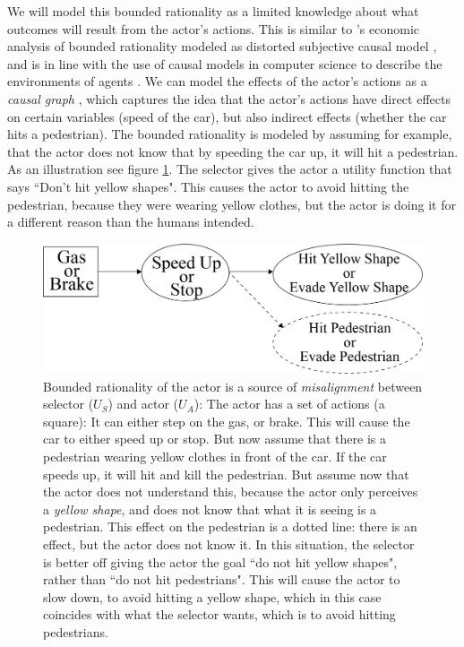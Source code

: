 We will model this bounded rationality as a limited knowledge about what outcomes will result from the actor's actions. This is similar to \citeauthor{Spiegler2016}'s economic analysis of bounded rationality modeled as distorted subjective causal model \citeyearpar{Spiegler2016,Spiegler2019}, and is in line with the use of causal models in computer science to describe the environments of agents \citep{Everitt2019}. We can model the effects of the actor's actions as a \textit{causal graph} \citep{Pearl2000,Dawid2002}, which captures the idea that the actor's actions have direct effects on certain variables (speed of the car), but also indirect effects (whether the car hits a pedestrian). The bounded rationality is modeled by assuming for example, that the actor does not know that by speeding the car up, it will hit a pedestrian. As an illustration see figure \ref{fig:intro-self-driving-car-bounded-rationality}. The selector gives the actor a utility function that says ``Don't hit yellow shapes". This causes the actor to avoid hitting the pedestrian, because they were wearing yellow clothes, but the actor is doing it for a different reason than the humans intended.

\begin{figure}[h]
	\centering
	\captionsetup{labelfont=bf,font=small,labelsep=period}
	\includegraphics[width=0.7\linewidth]{"images/intro-images/intro-self-driving-car-bounded-rationality"}
	\caption{\rightskip=20pt\leftskip=20pt Bounded rationality of the actor is a source of \textit{misalignment} between selector ($U_S$) and actor ($U_A$): The actor has a set of actions (a square): It can either step on the gas, or brake. This will cause the car to either speed up or stop. But now assume that there is a pedestrian wearing yellow clothes in front of the car. If the car speeds up, it will hit and kill the pedestrian. But assume now that the actor does not understand this, because the actor only perceives a \textit{yellow shape}, and does not know that what it is seeing is a pedestrian. This effect on the pedestrian is a dotted line: there is an effect, but the actor does not know it.		
	In this situation, the selector is better off giving the actor the goal ``do not hit yellow shapes", rather than ``do not hit pedestrians". This will cause the actor to slow down, to avoid hitting a yellow shape, which in this case coincides with what the selector wants, which is to avoid hitting pedestrians.
	}
	\label{fig:intro-self-driving-car-bounded-rationality} 	
\end{figure}

